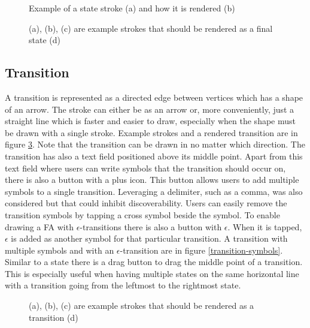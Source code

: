 \begin{figure}
    \centering
    \caption{Example of a state stroke (a) and how it is rendered (b)}\label{state}
\end{figure}

\begin{figure}
    \centering
    \caption{(a), (b), (c) are example strokes that should be rendered as a final state (d)}\label{final-state}
\end{figure}

\subsection{Transition}

A transition is represented as a directed edge between vertices which has a shape of an arrow. The stroke can either be as an arrow or, more conveniently, just a straight line which is faster and easier to draw, especially when the shape must be drawn with a single stroke. Example strokes and a rendered transition are in figure \ref{transition}. Note that the transition can be drawn in no matter which direction. The transition has also a text field positioned above its middle point. Apart from this text field where users can write symbols that the transition should occur on, there is also a button with a plus icon. This button allows users to add multiple symbols to a single transition. Leveraging a delimiter, such as a comma, was also considered but that could inhibit discoverability. Users can easily remove the transition symbols by tapping a cross symbol beside the symbol. To enable drawing a FA with $\epsilon$-transitions there is also a button with $\epsilon$. When it is tapped, $\epsilon$ is added as another symbol for that particular transition. A transition with multiple symbols and with an $\epsilon$-transition are in figure \ref{transition-symbols}. Similar to a state there is a drag button to drag the middle point of a transition. This is especially useful when having multiple states on the same horizontal line with a transition going from the leftmost to the rightmost state.

\begin{figure}
    \centering
    \caption{(a), (b), (c) are example strokes that should be rendered as a transition (d)}\label{transition}
\end{figure}

